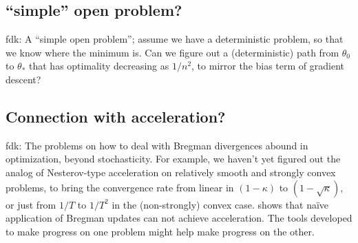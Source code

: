 \documentclass[twoside]{article}
\newcommand{\fdk}[1]{\textcolor{Periwinkle}{fdk:#1}}
\begin{document}
\subsection{``simple'' open problem?}
\fdk{
A ``simple open problem'';
assume we have a deterministic problem, so that we know where the minimum is. 
Can we figure out a (deterministic) path from $\theta_0$ to $\theta_*$ 
that has optimality decreasing as $1/n^2$, 
to mirror the bias term of gradient descent?
}

\subsection{Connection with acceleration?}
\fdk{
The problems on how to deal with Bregman divergences abound in optimization, beyond stochasticity. 
For example, we haven't yet figured out the analog of Nesterov-type acceleration 
on relatively smooth and strongly convex problems, 
to bring the convergence rate from linear in $(1-\kappa)$ to $(1-\sqrt{\kappa})$, 
or just from $1/T$ to $1/T^2$ in the (non-strongly) convex case.
\citet{dragomir2021optimal}  shows that naïve application of Bregman updates can not achieve acceleration.
The tools developed to make progress on one problem might help make progress on the other. 
}
\end{document}
